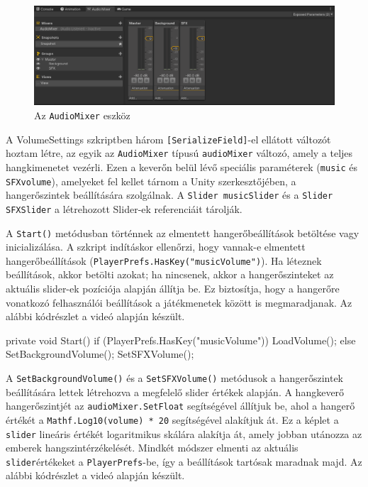 \begin{figure}
\centering
\includegraphics[width = \textwidth]{images/audiomixer.png}
\caption{Az \texttt{AudioMixer} eszköz}
\label{fig:audiomixer}
\end{figure}

A VolumeSettings szkriptben három \texttt{[SerializeField]}-el ellátott változót hoztam létre, az egyik az \texttt{AudioMixer} típusú \texttt{audioMixer} változó, amely a teljes hangkimenetet vezérli. Ezen a keverőn belül lévő speciális paraméterek (\texttt{music} és \texttt{SFXvolume}), amelyeket fel kellet tárnom a Unity szerkesztőjében, a hangerőszintek beállítására szolgálnak. A \texttt{Slider musicSlider} és a \texttt{Slider SFXSlider} a létrehozott Slider-ek referenciáit tárolják.

A \texttt{Start()} metódusban történnek az elmentett hangerőbeállítások betöltése vagy inicializálása. A szkript indításkor ellenőrzi, hogy vannak-e elmentett hangerőbeállítások (\texttt{PlayerPrefs.HasKey("musicVolume")}). Ha léteznek beállítások, akkor betölti azokat; ha nincsenek, akkor a hangerőszinteket az aktuális slider-ek pozíciója alapján állítja be. Ez biztosítja, hogy a hangerőre vonatkozó felhasználói beállítások a játékmenetek között is megmaradjanak. Az alábbi kódrészlet a \cite{volumesettings} videó alapján készült.

\begin{java}
private void Start()
{
    if (PlayerPrefs.HasKey("musicVolume"))
    {
        LoadVolume();
    }
    else 
    {
        SetBackgroundVolume();
        SetSFXVolume();
    }
}
\end{java}

A \texttt{SetBackgroundVolume()} és a \texttt{SetSFXVolume()} metódusok a hangerőszintek beállítására lettek létrehozva a megfelelő slider értékek alapján. A hangkeverő hangerőszintjét az \texttt{audioMixer.SetFloat} segítségével állítjuk be, ahol a hangerő értékét a \texttt{Mathf.Log10(volume) * 20} segítségével alakítjuk át. Ez a képlet a \texttt{slider} lineáris értékét logaritmikus skálára alakítja át, amely jobban utánozza az emberek hangszintérzékelését. Mindkét módszer elmenti az aktuális \texttt{slider}értékeket a \texttt{PlayerPrefs}-be, így a beállítások tartósak maradnak majd. Az alábbi kódrészlet a \cite{volumesettings} videó alapján készült.

